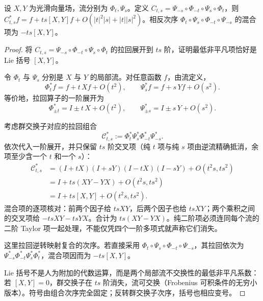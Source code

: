 \begin{proposition}[流交换子的混合二阶项]
设 $X,Y$ 为光滑向量场，流分别为 $\Phi_t,\Psi_s$。定义 $C_{t,s}=\Psi_{-s}\circ\Phi_{-t}\circ\Psi_s\circ\Phi_t$，则 $C_{t,s}^*f=f+ts[X,Y]f+O(|t|^2|s|+|t||s|^2)$。相反次序 $\Phi_t\circ\Psi_s\circ\Phi_{-t}\circ\Psi_{-s}$ 的混合项为 $-ts[X,Y]$。
\end{proposition}
\begin{proof}
将 $C_{t,s}=\Psi_{-s}\circ\Phi_{-t}\circ\Psi_s\circ\Phi_t$ 的拉回展开到 $ts$ 阶，证明最低非平凡项恰好是 Lie 括号 $[X,Y]$。

令 $\Phi_t$ 与 $\Psi_s$ 分别是 $X$ 与 $Y$ 的局部流。对任意函数 $f$，由流定义，
\begin{equation*}
 \Phi_t^*f=f+t\,Xf+O(t^2),
 \qquad
 \Psi_s^*f=f+s\,Yf+O(s^2).
\end{equation*}
等价地，拉回算子的一阶展开为
\begin{equation*}
 \Phi_{\pm t}^*=I\pm t\,X+O(t^2),
 \qquad
 \Psi_{\pm s}^*=I\pm s\,Y+O(s^2).
\end{equation*}

考虑群交换子对应的拉回组合
\begin{equation*}
 \mathcal C_{t,s}^*
 :=\Phi_t^*\Psi_s^*\Phi_{-t}^*\Psi_{-s}^*.
\end{equation*}
依次代入一阶展开，并只保留 $ts$ 阶交叉项（纯 $t$ 项与纯 $s$ 项由逆流精确抵消，余项至少含一个 $t$ 和一个 $s$）：
\begin{align*}
 \mathcal C_{t,s}^*
 &=(I+tX)(I+sY)(I-tX)(I-sY)+O(t^2s,ts^2)\\
 &=I+ts(XY-YX)+O(t^2s,ts^2)\\
 &=I+ts[X,Y]+O(t^2s,ts^2).
\end{align*}
混合项的逐项核对：前两个因子给 $tsXY$，后两个因子也给 $tsXY$；两个乘积之间的交叉项给 $-tsXY-tsYX$。合计为 $ts(XY-YX)$。纯二阶项必须连同每个流的二阶 Taylor 项一起处理，不能仅凭四个一阶多项式就声称它们消失。

这里拉回逆转映射复合的次序。若直接采用 $\Phi_t\circ\Psi_s\circ\Phi_{-t}\circ\Psi_{-s}$，其拉回依次为 $\Psi_{-s}^*\Phi_{-t}^*\Psi_s^*\Phi_t^*$，混合项因而为 $-ts[X,Y]$。

Lie 括号不是人为附加的代数运算，而是两个局部流不交换性的最低非平凡系数：若 $[X,Y]=0$，群交换子在 $ts$ 阶消失，流可交换（Frobenius 可积条件的无穷小版本）。符号由组合次序完全固定；反转群交换子次序，括号也相应变号。
\end{proof}

